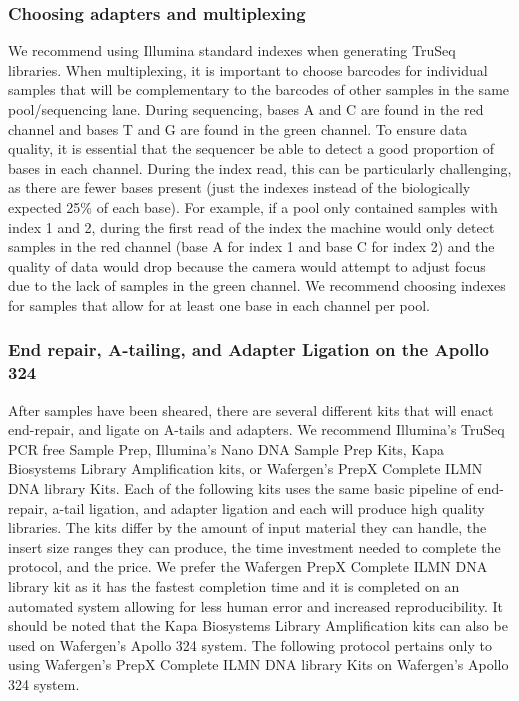 \documentclass[graybox]{svmult}
\begin{document}
\subsubsection{Choosing adapters and multiplexing}

We recommend using Illumina standard indexes when generating TruSeq libraries. When multiplexing, it is 
important to choose barcodes for individual samples that will be complementary to the barcodes of other 
samples in the same pool/sequencing lane. During sequencing, bases A and C are found in the red channel 
and bases T and G are found in the green channel. To ensure data quality, it is essential that the 
sequencer be able to detect a good proportion of bases in each channel. During the index read, this 
can be particularly challenging, as there are fewer bases present (just the indexes instead of the 
biologically expected 25\% of each base). For example, if a pool only contained samples with index 
1 and 2, during the first read of the index the machine would only detect samples in the red channel 
(base A for index 1 and base C for index 2) and the quality of data would drop because the camera 
would attempt to adjust focus due to the lack of samples in the green channel. We recommend choosing 
indexes for samples that allow for at least one base in each channel per pool.

\subsubsection{End repair, A-tailing, and Adapter Ligation on the Apollo 324}

After samples have been sheared, there are several different kits that will enact end-repair, and ligate on A-tails and adapters. We recommend Illumina’s TruSeq PCR free Sample Prep, Illumina’s Nano DNA Sample Prep Kits, Kapa Biosystems Library Amplification kits, or Wafergen’s PrepX Complete ILMN DNA library Kits. Each of the following kits uses the same basic pipeline of end-repair, a-tail ligation, and adapter ligation and each will produce high quality libraries. The kits differ by the amount of input material they can handle, the insert size ranges they can produce, the time investment needed to complete the protocol, and the price. We prefer the Wafergen PrepX Complete ILMN DNA library kit as it has the fastest completion time and it is completed on an automated system allowing for less human error and increased reproducibility. It should be noted that the Kapa Biosystems Library Amplification kits can also be used on Wafergen’s Apollo 324 system. The following protocol pertains only to using Wafergen’s PrepX Complete ILMN DNA library Kits on Wafergen’s Apollo 324 system.
\end{document}
